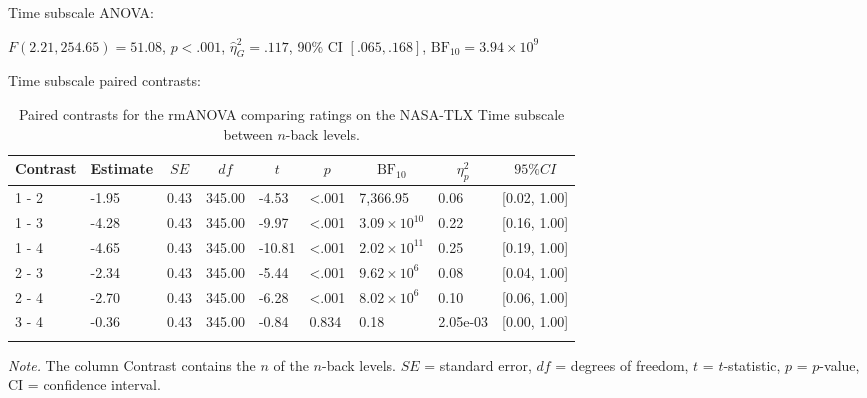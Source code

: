 \documentclass[
  man,floatsintext]{apa6}
\begin{document}
\newpage

Time subscale ANOVA:

\(F(2.21, 254.65) = 51.08\), \(p < .001\), \(\hat{\eta}^2_G = .117\), 90\% CI \([.065, .168]\), \(\mathrm{BF}_{\textrm{10}} = 3.94 \times 10^{9}\)

Time subscale paired contrasts:

\begin{table}[H]

\begin{center}
\begin{threeparttable}

\caption{\label{tab:unnamed-chunk-5}Paired contrasts for the rmANOVA comparing ratings on the NASA-TLX Time subscale between $n$-back levels.}

\begin{tabular}{lllllllll}
\toprule
Contrast & \multicolumn{1}{c}{Estimate} & \multicolumn{1}{c}{$SE$} & \multicolumn{1}{c}{$df$} & \multicolumn{1}{c}{$t$} & \multicolumn{1}{c}{$p$} & \multicolumn{1}{c}{$\mathrm{BF}_{\textrm{10}}$} & \multicolumn{1}{c}{$\eta_{p}^{2}$} & \multicolumn{1}{c}{$95\% CI$}\\
\midrule
1 - 2 & -1.95 & 0.43 & 345.00 & -4.53 & <.001 & 7,366.95 & 0.06 & {}[0.02, 1.00]\\
1 - 3 & -4.28 & 0.43 & 345.00 & -9.97 & <.001 & $3.09 \times 10^{10}$ & 0.22 & {}[0.16, 1.00]\\
1 - 4 & -4.65 & 0.43 & 345.00 & -10.81 & <.001 & $2.02 \times 10^{11}$ & 0.25 & {}[0.19, 1.00]\\
2 - 3 & -2.34 & 0.43 & 345.00 & -5.44 & <.001 & $9.62 \times 10^{6}$ & 0.08 & {}[0.04, 1.00]\\
2 - 4 & -2.70 & 0.43 & 345.00 & -6.28 & <.001 & $8.02 \times 10^{6}$ & 0.10 & {}[0.06, 1.00]\\
3 - 4 & -0.36 & 0.43 & 345.00 & -0.84 & 0.834 & 0.18 & 2.05e-03 & {}[0.00, 1.00]\\
\bottomrule
\addlinespace
\end{tabular}

\begin{tablenotes}[para]
\normalsize{\textit{Note.} The column Contrast contains the $n$ of the $n$-back levels. $SE$ = standard error, $df$ = degrees of freedom, $t$ = $t$-statistic, $p$ = $p$-value, CI = confidence interval.}
\end{tablenotes}

\end{threeparttable}
\end{center}

\end{table}
\end{document}
